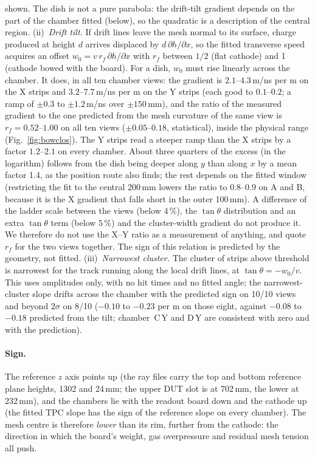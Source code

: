 shown. The dish is not a pure parabola: the drift-tilt gradient depends on the part of the chamber fitted (below), so the quadratic is a description of the
central region.
(ii)~\emph{Drift tilt.} If drift lines leave the mesh normal to its surface, charge produced at height $d$ arrives
displaced by $d\,\partial h/\partial x$, so the fitted transverse speed acquires an offset
$w_0 = v\,r_f\,\partial h/\partial x$ with $r_f$ between $1/2$ (flat cathode) and 1 (cathode bowed with the board).
For a dish, $w_0$ must rise linearly across the chamber. It does, in all ten chamber views: the gradient is
$2.1$--$4.3$\,\textmu m/ns per m on the X strips and $3.2$--$7.7$\,\textmu m/ns per m on the Y strips (each good to $0.1$--$0.2$; a ramp of $\pm0.3$ to
$\pm1.2$\,\textmu m/ns over $\pm150$\,mm), and the ratio of the measured gradient to the one predicted from the mesh curvature of the
same view is $r_f = 0.52$--$1.00$ on all ten views ($\pm0.05$--$0.18$, statistical), inside the physical range (Fig.~\ref{fig:bowclos}). The Y strips read a steeper ramp than the X strips by a factor
$1.2$--$2.1$ on every chamber. About three quarters of the excess (in the logarithm) follows from the dish being deeper along $y$ than along $x$ by a mean
factor 1.4, as the position route also finds; the rest depends on the fitted window (restricting the fit to the central 200\,mm lowers the ratio to
$0.8$--$0.9$ on A and B, because it is the X gradient that falls short in the outer 100\,mm). A difference of the ladder scale between the views (below $4\,\%$),
the $\tan\theta$ distribution and an extra $\tan\theta$ term (below $5\,\%$) and the cluster-width gradient do not produce it. We therefore do not use the X--Y
ratio as a measurement of anything, and quote $r_f$ for the two views together. The sign of this relation is predicted by the geometry, not fitted.
(iii)~\emph{Narrowest cluster.} The cluster of strips above threshold is narrowest for the track running along the
local drift lines, at $\tan\theta = -w_0/v$. This uses amplitudes only, with no hit times and no fitted angle; the
narrowest-cluster slope drifts across the chamber with the predicted sign on 10/10 views and beyond $2\sigma$ on 8/10
($-0.10$ to $-0.23$ per m on those eight, against $-0.08$ to $-0.18$ predicted from the tilt; chamber~C\,Y and D\,Y are consistent with
zero and with the prediction).

\paragraph{Sign.}
The reference $z$ axis points up (the ray files carry the top and bottom reference plane heights, 1302 and 24\,mm; the upper DUT slot
is at 702\,mm, the lower at 232\,mm), and the chambers lie with the readout board down and the cathode up (the fitted
TPC slope has the sign of the reference slope on every chamber). The mesh centre is therefore \emph{lower} than its rim,
further from the cathode: the direction in which the board's weight, gas overpressure and residual mesh tension all push.

